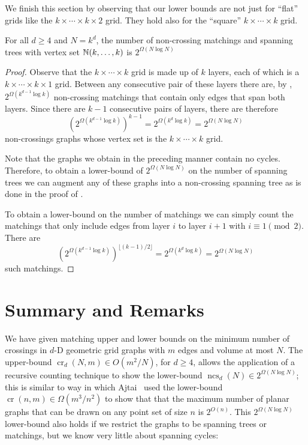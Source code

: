 \documentclass{patmorin}
\newcommand{\n}{N}
\DeclareMathOperator{\crs}{cr}
\DeclareMathOperator{\ncs}{ncs}
\begin{document}
We finish this section by observing that our lower bounds are not
just for ``flat'' grids like the $k\times\cdots\times k\times 2$ grid.
They hold also for the ``square'' $k\times\cdots\times k$ grid.

\begin{cor}
  For all $d\ge 4$ and $\n=k^d$, the number of non-crossing matchings
  and spanning trees with vertex set $\mathbb{N}(k,\ldots,k)$ is
  $2^{\Omega(\n\log \n)}$
\end{cor}

\begin{proof}
  Observe that the $k\times\cdots\times k$ grid is made up of $k$ layers,
  each of which is a $k\times\cdots\times k\times1$ grid. Between any
  consecutive pair of these layers there are, by ,
  $2^{\Omega(k^{d-1}\log k)}$ non-crossing matchings that contain only
  edges that span both layers.  Since there are $k-1$ consecutive pairs
  of layers, there are therefore
  \[
     \left(2^{\Omega(k^{d-1}\log k)}\right)^{k-1} = 2^{\Omega(k^d\log k)} 
        = 2^{\Omega(\n\log\n)}
  \]
  non-crossings graphs whose vertex set is the $k\times\cdots\times k$ grid.

  Note that the graphs we obtain in the preceding manner contain no
  cycles.  Therefore, to obtain a lower-bound of $2^{\Omega(\n\log
  \n)}$ on the number of spanning trees we can augment any of these
  graphs into a non-crossing spanning tree as is done in the proof of
  .

  To obtain a lower-bound on the number of matchings we can simply count
  the matchings that only include edges from layer $i$ to layer $i+1$
  with $i\equiv 1\pmod 2$.  There are
  \[
     \left(2^{\Omega(k^{d-1}\log k)}\right)^{\lfloor (k-1)/2\rfloor} 
       = 2^{\Omega(k^d\log k)}
       = 2^{\Omega(\n\log\n)}
  \]
  such matchings.
\end{proof}


\section{Summary and Remarks}

We have given matching upper and lower bounds on the minimum number of
crossings in $d$-D geometric grid graphs with $m$ edges and volume at
most $\n$.  The upper-bound $\crs_d(\n,m)\in O(m^2/\n)$, for $d\ge 4$,
allows the application of a recursive counting technique to show the
lower-bound $\ncs_d(\n)\in 2^{\Omega(\n\log\n)}$; this is similar to way
in which Ajtai \etal\ used the lower-bound $\crs(n,m)\in\Omega(m^3/n^2)$
to show that that the maximum number of planar graphs that can be drawn
on any point set of size $n$ is $2^{O(n)}$.  This $2^{\Omega(\n\log\n)}$
lower-bound also holds if we restrict the graphs to be spanning trees
or matchings, but we know very little about spanning cycles:
\end{document}
